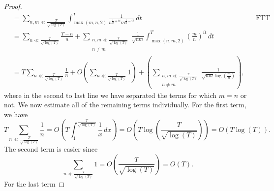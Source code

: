 \begin{proof}
\begin{align*}
        &= \sum_{n,m \ll \frac{T}{\sqrt{\log(T)}}}\int_{\max(m,n,2)}^{T}\frac{1}{n^{\frac{1}{2}+it}m^{\frac{1}{2}-it}}\,dt && \text{FTT} \\
        &= \sum_{n \ll \frac{T}{\sqrt{\log(T)}}}\frac{T-n}{n}+ \sum_{\substack{n,m \ll \frac{T}{\sqrt{\log(T)}} \\ n \neq m}}\frac{1}{\sqrt{nm}}\int_{\max(n,m,2)}^{T}\left(\frac{m}{n}\right)^{it}\,dt \\
        &= T\sum_{n \ll \frac{T}{\sqrt{\log(T)}}}\frac{1}{n}+O\left(\sum_{n \ll \frac{T}{\sqrt{\log(T)}}}1\right)+\left(\sum_{\substack{n,m \ll \frac{T}{\sqrt{\log(T)}} \\ n \neq m}}\frac{1}{\sqrt{nm}\log\left(\frac{m}{n}\right)}\right),
      \end{align*}
      where in the second to last line we have separated the terms for which $m = n$ or not. We now estimate all of the remaining terms individually. For the first term, we have
      \[
        T\sum_{n \ll \frac{T}{\sqrt{\log(T)}}}\frac{1}{n} = O\left(T\int_{1}^{\frac{T}{\sqrt{\log(T)}}}\frac{1}{x}\,dx\right) = O\left(T\log\left(\frac{T}{\sqrt{\log(T)}}\right)\right) = O(T\log(T)).
      \]
      The second term is easier since
      \[
        \sum_{n \ll \frac{T}{\sqrt{\log(T)}}}1 = O\left(\frac{T}{\sqrt{\log(T)}}\right) = O(T).
      \]
      For the last term 
    \end{proof}